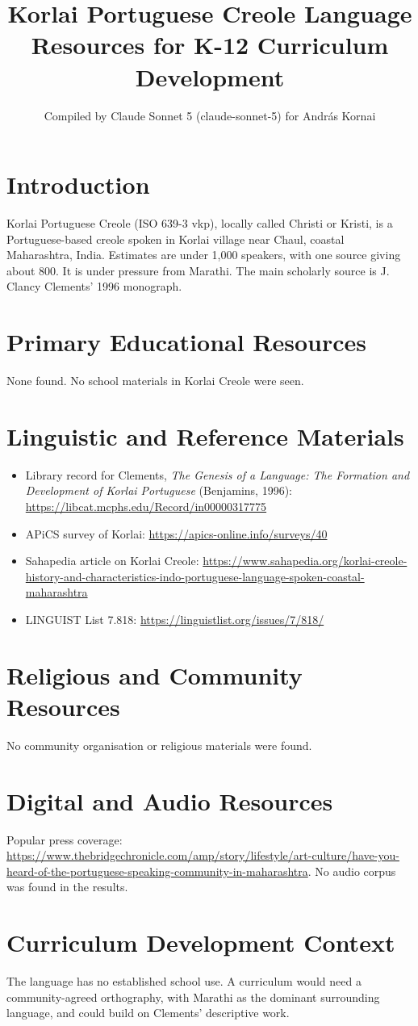 \documentclass[12pt]{article}
\title{Korlai Portuguese Creole Language Resources for K-12 Curriculum Development}
\author{Compiled by Claude Sonnet 5 (claude-sonnet-5) for Andr\'as Kornai}
\date{}
\begin{document}
\maketitle
\section{Introduction}
Korlai Portuguese Creole (ISO 639-3 vkp), locally called Christi or Kristi, is a Portuguese-based creole spoken in Korlai village near Chaul, coastal Maharashtra, India. Estimates are under 1,000 speakers, with one source giving about 800. It is under pressure from Marathi. The main scholarly source is J. Clancy Clements' 1996 monograph.
\section{Primary Educational Resources}
None found. No school materials in Korlai Creole were seen.
\section{Linguistic and Reference Materials}
\begin{itemize}
\item Library record for Clements, \emph{The Genesis of a Language: The Formation and Development of Korlai Portuguese} (Benjamins, 1996): \url{https://libcat.mcphs.edu/Record/in00000317775}
\item APiCS survey of Korlai: \url{https://apics-online.info/surveys/40}
\item Sahapedia article on Korlai Creole: \url{https://www.sahapedia.org/korlai-creole-history-and-characteristics-indo-portuguese-language-spoken-coastal-maharashtra}
\item LINGUIST List 7.818: \url{https://linguistlist.org/issues/7/818/}
\end{itemize}
\section{Religious and Community Resources}
No community organisation or religious materials were found.
\section{Digital and Audio Resources}
Popular press coverage: \url{https://www.thebridgechronicle.com/amp/story/lifestyle/art-culture/have-you-heard-of-the-portuguese-speaking-community-in-maharashtra}. No audio corpus was found in the results.
\section{Curriculum Development Context}
The language has no established school use. A curriculum would need a community-agreed orthography, with Marathi as the dominant surrounding language, and could build on Clements' descriptive work.
\end{document}
